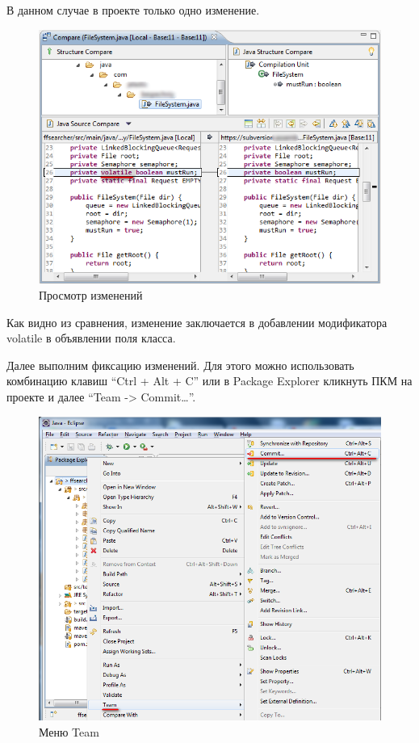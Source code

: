 \documentclass[a4paper,12pt]{article}
\begin{document}
В данном случае в проекте только одно изменение.
\begin{figure}[h!]
	\centering
	\includegraphics[scale=0.80]{eclipse-diff-2.png}
	\vspace{-10pt}
	\caption{Просмотр изменений}
\end{figure}

Как видно из сравнения, изменение заключается в добавлении модификатора
volatile в объявлении поля класса.

Далее выполним фиксацию изменений. Для этого можно использовать
комбинацию клавиш ``Ctrl + Alt + C'' или в Package Explorer кликнуть ПКМ
на проекте и далее ``Team -\textgreater{} Commit\ldots{}''.

\begin{figure}[h!]
	\centering
	\includegraphics[scale=0.60]{eclipse-commit-1.png} 
	\vspace{-10pt}
	\caption{Меню Team}
\end{figure}
\end{document}

